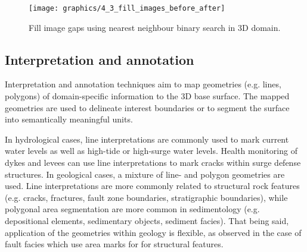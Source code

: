 \documentclass[review]{elsarticle}
\begin{document}
\begin{figure}[h]
\centering
\texttt{[image: graphics/4\_3\_fill\_images\_before\_after]}
\caption{Fill image gaps using nearest neighbour binary search in 3D domain.}
\label{fig:4_3_fill_images_before_after}
\end{figure}


\subsection{Interpretation and annotation}
\label{sec:algorithms:interpretation}

Interpretation and annotation techniques aim to map geometries (e.g. lines, polygons) of domain-specific information to the 3D base surface. The mapped geometries are used to delineate interest boundaries or to segment the surface into semantically meaningful units.


In hydrological cases, line interpretations are commonly used to mark current water levels as well as high-tide or high-surge water levels. Health monitoring of dykes and levees can use line interpretations to mark cracks within surge defense structures. In geological cases, a mixture of line- and polygon geometries are used. Line interpretations are more commonly related to structural rock features (e.g. cracks, fractures, fault zone boundaries, stratigraphic boundaries), while polygonal area segmentation are more common in sedimentology (e.g. depositional elements, sedimentary objects, sediment facies). That being said, application of the geometries within geology is flexible, as observed in the case of fault facies which use area marks for for structural features.
\end{document}
